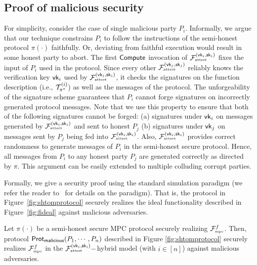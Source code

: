 \subsection{Proof of malicious security}
\label{app:proof}
For simplicity, consider the case of single malicious party $P_i$. 
Informally, we argue that our technique constrains $P_i$ to follow the instructions of the semi-honest protocol $\pi(\cdot)$ faithfully. 
Or, deviating from faithful execution would result in some honest party to abort. 
%
The first $\mathsf{Compute}$ invocation of $\mathcal{F}_{\textrm{\tiny{attest}}}^{(\mathsf{vk}_i,\mathsf{sk}_i)}$ fixes the input of $P_i$ used in the protocol. 
Since every other $\mathcal{F}_{\textrm{\tiny{attest}}}^{(\mathsf{vk}_j,\mathsf{sk}_j)}$ reliably knows
the verification key $\mathsf{vk}_i$ used by $\mathcal{F}_{\textrm{\tiny{attest}}}^{(\mathsf{vk}_i,\mathsf{sk}_i)}$,
it checks the signatures on the function description (i.e., $\mathcal{T}^{(i)}_{\pi^*}$)
 as well as the messages of the protocol. The unforgeability of the signature scheme guarantees that $P_i$ cannot forge signatures on incorrectly generated protocol messages. Note that we use this property to ensure that both of the following signatures cannot be forged: (a) signatures under $\mathsf{vk}_i$ on messages generated by $\mathcal{F}_{\textrm{\tiny{attest}}}^{(\mathsf{vk}_i,\mathsf{sk}_i)}$ and sent to honest $P_j$ (b) signatures under $\mathsf{vk}_j$ on messages sent by $P_j$ being fed into $\mathcal{F}_{\textrm{\tiny{attest}}}^{(\mathsf{vk}_i,\mathsf{sk}_i)}$. 
%
Also, $\mathcal{F}_{\textrm{\tiny{attest}}}^{(\mathsf{vk}_i,\mathsf{sk}_i)}$ provides correct randomness to generate messages of $P_i$ in the semi-honest secure protocol. 
%
Hence, all messages from $P_i$ to any honest party $P_j$ are generated correctly as directed by $\pi$. 
This argument can be easily extended to multiple colluding corrupt parties.


Formally, we give a security proof using the standard simulation paradigm (we refer the reader to~\cite{gmw,canetti00} for details on the paradigm).
That is, the protocol in Figure~\ref{fig:shtomprotocol} securely realizes the ideal \mpc functionality described in Figure~\ref{fig:fideal} against malicious adversaries. 

\begin{theorem}[Restated]
\label{theorem:maliciousmpc}
Let $\pi(\cdot)$ be a semi-honest secure MPC protocol securely realizing $\mathcal{F}_{\textrm{\tiny{mpc}}}^f$. Then, protocol $\mathsf{Prot}_{\tiny{\mathsf{malicious}}}(P_1,\cdots,P_n)$ described in Figure \ref{fig:shtomprotocol} securely realizes $\mathcal{F}_{\textrm{\tiny{mpc}}}^f$ in the $\mathcal{F}_{\textrm{\tiny{attest}}}^{(\mathsf{vk}_i,\mathsf{sk}_i)}-$hybrid model (with $i \in [n]$) against malicious adversaries.
\end{theorem}

